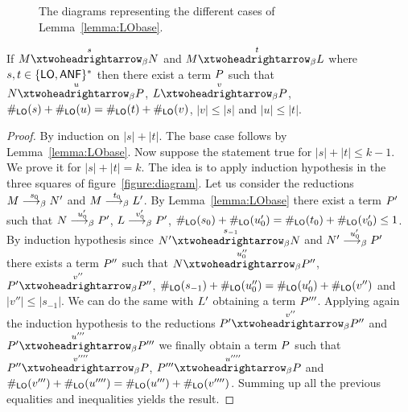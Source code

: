 \begin{figure}
{\begin{minipage}{.96\textwidth}
	\qquad
	\end{minipage}}
	\caption{The diagrams representing the different cases of Lemma~\ref{lemma:LObase}.}
	\label{figure:diagramBase}
\end{figure}
\begin{lemma}\label{lemma:LOdiamond}
	If $\termone\redbetared{s}\termtwo$ and $\termone\redbetared{t}\termthree$ where $s,t\in\{\textsf{LO},\mathsf{ANF}\}^*$ then there exist a term $P$ such that $\termtwo\redbetared{u}\termfour$, $\termthree\redbetared{v}\termfour$, $\#_{\textsf{LO}}(s)+\#_{\textsf{LO}}(u)=\#_{\textsf{LO}}(t)+\#_{\textsf{LO}}(v)$, $|v|\leq |s|$ and $|u|\leq |t|$.
\end{lemma}
\begin{proof}
	By induction on $|s|+|t|$. The base case follows by Lemma~\ref{lemma:LObase}. Now suppose the statement true for $|s|+|t|\leq k-1$. We prove it for $|s|+|t|=k$. The idea is to apply induction hypothesis in the three squares of figure~\ref{figure:diagram}.  Let us consider the reductions $M\overset{s_0}{\longrightarrow_\beta}N'$ and $M\overset{t_0}{\longrightarrow_\beta}L'$. By Lemma~\ref{lemma:LObase} there exist a term $P'$ such that $N\overset{u_0'}{\longrightarrow_\beta}P'$, $L\overset{v_0'}{\longrightarrow_\beta}P'$, $\#_{\textsf{LO}}(s_0)+\#_{\textsf{LO}}(u'_0)=\#_{\textsf{LO}}(t_0)+\#_{\textsf{LO}}(v_0')\leq 1$. By induction hypothesis since $\termtwo'\redbetared{s_{-1}}\termtwo$ and $N'\overset{u'_0}{\longrightarrow_\beta}P'$ there exists a term $P''$ such that $\termtwo\redbetared{u''_0}\termfour''$, $\termfour'\redbetared{v''} \termfour''$, $\#_{\textsf{LO}}(s_{-1})+\#_{\textsf{LO}}(u''_0)=\#_{\textsf{LO}}(u'_0)+\#_{\textsf{LO}}(v'')$ and $|v''|\leq |s_{-1}|$. We can do the same with $L'$ obtaining a term $P'''$. Applying again the induction hypothesis to the reductions $\termfour'\redbetared{v''} \termfour''$ and $\termfour'\redbetared{u'''} \termfour'''$ we finally obtain a term $P$ such that $\termfour''\redbetared{v''''} \termfour$, $\termfour'''\redbetared{u''''} \termfour$ and $\#_{\textsf{LO}}(v''')+\#_{\textsf{LO}}(u'''')=\#_{\textsf{LO}}(u''')+\#_{\textsf{LO}}(v'''')$. Summing up all the previous equalities and inequalities yields the result.
\end{proof}
